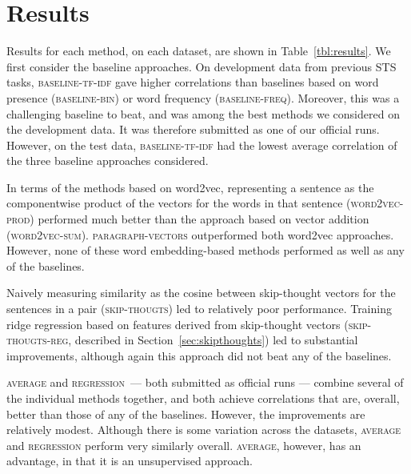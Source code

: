 \documentclass[11pt,letterpaper]{article}
\newcommand{\secref}[1]{Section~\ref{#1}}
\newcommand{\tabref}[1]{Table~\ref{#1}}
\newcommand{\baselinebin}{\textsc{baseline-bin}\xspace}
\newcommand{\baselinefreq}{\textsc{baseline-freq}\xspace}
\newcommand{\baselinetfidf}{\textsc{baseline-tf-idf}\xspace}
\newcommand{\wordvecsum}{\textsc{word2vec-sum}\xspace}
\newcommand{\wordvecprod}{\textsc{word2vec-prod}\xspace}
\newcommand{\parvec}{\textsc{paragraph-vectors}\xspace}
\newcommand{\skipthoughts}{\textsc{skip-thougts}\xspace}
\newcommand{\skipthoughtsreg}{\textsc{skip-thougts-reg}\xspace}
\newcommand{\average}{\textsc{average}\xspace}
\newcommand{\reg}{\textsc{regression}\xspace}
\begin{document}
\section{Results}



Results for each method, on each dataset, are shown in
\tabref{tbl:results}. We first consider the baseline approaches. On
development data from previous STS tasks, \baselinetfidf gave higher
correlations than baselines based on word presence (\baselinebin) or
word frequency (\baselinefreq). Moreover, this was a challenging
baseline to beat, and was among the best methods we considered on the
development data. It was therefore submitted as one of our official
runs. However, on the test data, \baselinetfidf had the lowest average
correlation of the three baseline approaches considered.

In terms of the methods based on word2vec, representing a sentence as
the componentwise product of the vectors for the words in that
sentence (\wordvecprod) performed much better than the approach based
on vector addition (\wordvecsum). \parvec outperformed both word2vec
approaches. However, none of these word embedding-based methods
performed as well as any of the baselines.

Naively measuring similarity as the cosine between skip-thought
vectors for the sentences in a pair (\skipthoughts) led to relatively
poor performance. Training ridge regression based on features derived
from skip-thought vectors (\skipthoughtsreg, described in
\secref{sec:skipthoughts}) led to substantial improvements, although
again this approach did not beat any of the baselines.

\average and \reg~--- both submitted as official runs --- combine
several of the individual methods together, and both achieve
correlations that are, overall, better than those of any of the
baselines. However, the improvements are relatively modest. Although
there is some variation across the datasets, \average and \reg perform
very similarly overall. \average, however, has an advantage, in that
it is an unsupervised approach.






\end{document}
